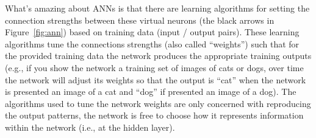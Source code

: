 \documentclass[assignment01_Solutions]{subfiles}
\begin{document}
What's amazing about ANNs is that there are learning algorithms for setting the connection strengths between these virtual neurons (the black arrows in Figure~\ref{fig:ann}) based on training data (input / output pairs).  These learning algorithms tune the connections strengths (also called ``weights'') such that for the provided training data the network produces the appropriate training outputs (e.g., if you show the network a training set of images of cats or dogs, over time the network will adjust its weights so that the output is ``cat'' when the network is presented an image of a cat and ``dog'' if presented an image of a dog).  The algorithms used to tune the network weights are only concerned with reproducing the output patterns, the network is free to choose how it represents information within the network (i.e., at the hidden layer).
\end{document}
